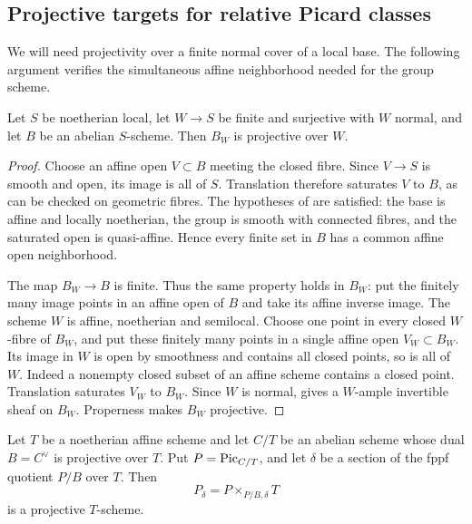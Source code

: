 \subsection{Projective targets for relative Picard classes}

We will need projectivity over a finite normal cover of a local
base. The following argument verifies the simultaneous affine
neighborhood needed for the group scheme.

\begin{lemma}\label{lem:dual-projective-finite-normal-cover}
Let $S$ be noetherian local, let $W\to S$ be finite and surjective
with $W$ normal, and let $B$ be an abelian $S$-scheme. Then
$B_W$ is projective over $W$.
\end{lemma}

\begin{proof}
Choose an affine open $V\subset B$ meeting the closed fibre.
Since $V\to S$ is smooth and open, its image is all of $S$.
Translation therefore saturates $V$ to $B$, as can be checked on
geometric fibres. The hypotheses of \cite[6.6, Theorem~2(c)]{BLR}
are satisfied: the base is affine and locally noetherian, the group
is smooth with connected fibres, and the saturated open is
quasi-affine. Hence every finite set in $B$ has a common affine
open neighborhood.

The map $B_W\to B$ is finite. Thus the same property holds in $B_W$:
put the finitely many image points in an affine open of $B$ and
take its affine inverse image. The scheme $W$ is affine,
noetherian and semilocal. Choose one point in every closed
$W$-fibre of $B_W$, and put these finitely many points in a single
affine open $V_W\subset B_W$. Its image in $W$ is open by
smoothness and contains all closed points, so is all of $W$.
Indeed a nonempty closed subset of an affine scheme contains a
closed point. Translation saturates $V_W$ to $B_W$.
Since $W$ is normal, \cite[6.6, Theorem~2(d)]{BLR} gives a
$W$-ample invertible sheaf on $B_W$. Properness makes $B_W$
projective.
\end{proof}

\begin{lemma}\label{lem:projective-picard-class-torsor}
Let $T$ be a noetherian affine scheme and let $C/T$ be an abelian
scheme whose dual $B=C^\vee$ is projective over $T$. Put
$P=\operatorname{Pic}_{C/T}$, and let $\delta$ be a section of the fppf quotient
$P/B$ over $T$. Then
\[
 P_\delta=P\times_{P/B,\delta}T
\]
is a projective $T$-scheme.
\end{lemma}

